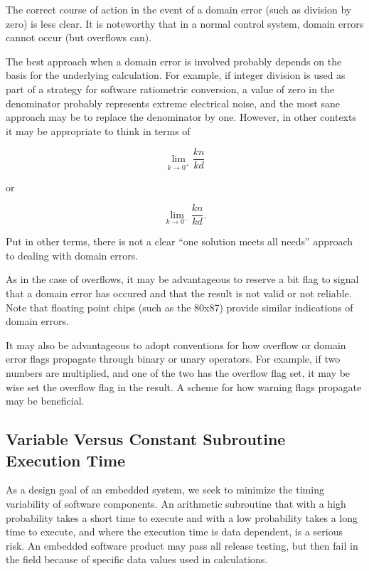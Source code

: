 The correct course of action in the event of a domain error (such
as division by zero) is less clear.  It is noteworthy that in a
normal control system, domain errors cannot occur (but overflows
can).

The best approach when a domain error is involved probably 
depends on the basis for the underlying calculation.  For
example, if integer division is used as part of a 
strategy for software ratiometric conversion, a value
of zero in the denominator probably represents extreme electrical
noise, and the most sane approach may be to replace the
denominator by one.  However, in other contexts it may be appropriate
to think in terms of 

\begin{equation}
\lim_{k \rightarrow 0^+} \frac{kn}{kd}
\end{equation}

\noindent{}or

\begin{equation}
\lim_{k \rightarrow 0^-} \frac{kn}{kd} .
\end{equation}

Put in other terms, there is not a clear ``one solution
meets all needs'' approach to dealing with domain
errors.

As in the case of overflows, it may be advantageous to reserve a bit
flag to signal that a domain error has occured and that the result
is not valid or not reliable.  Note that floating point chips
(such as the 80x87) provide similar indications of domain errors.

It may also be advantageous to adopt conventions for how 
overflow or domain error flags propagate through binary or
unary operators.  For example, if two numbers are multiplied, and
one of the two has the overflow flag set, it may be wise set the
overflow flag in the  result.  A scheme for how warning
flags propagate may be beneficial.


\subsection{Variable Versus Constant Subroutine Execution Time}
\label{ccil0:spdi0:svvc0}

As a design goal of an embedded system, we seek to minimize the
timing variability of software components.  An arithmetic subroutine
that with a high probability takes a short time to execute and with a
low probability takes a long time to execute, and where the execution
time is data dependent, is a serious risk.  An embedded software product 
may pass all release testing, but then fail in the field because of 
specific data values used in calculations.

